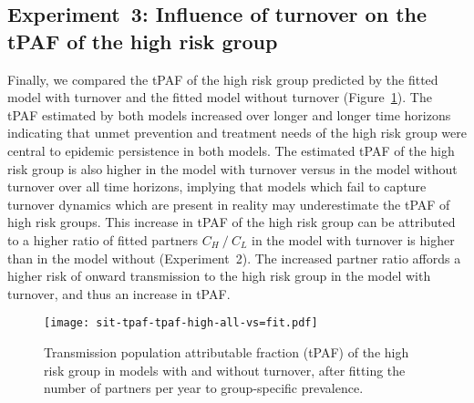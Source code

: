 \subsection{Experiment~3: Influence of turnover on the tPAF of the high risk group}
\label{ss:res-tpaf}
Finally, we compared the tPAF of the high risk group
predicted by the fitted model with turnover and 
the fitted model without turnover 
(Figure~\ref{fig:tpaf-fit}).
The tPAF estimated by both models
increased over longer and longer time horizons
indicating that unmet prevention and treatment
needs of the high risk group
were central to epidemic persistence in both models.			%
The estimated tPAF of the high risk group is also higher
in the model with turnover versus
in the model without turnover
over all time horizons,
implying that models which fail to capture turnover dynamics which are present in reality
may underestimate the tPAF of high risk groups.
This increase in tPAF of the high risk group can be attributed to
a higher ratio of fitted partners $C_H~/~C_L$
in the model with turnover is higher than in the model without
(Experiment~2).
The increased partner ratio affords
a higher risk of onward transmission to the high risk group
in the model with turnover, and thus an increase in tPAF.
\begin{figure}[!tbp]
  \centering
  \texttt{[image: sit-tpaf-tpaf-high-all-vs=fit.pdf]}
  \caption{Transmission population attributable fraction (tPAF)
    of the high risk group in models with and without turnover,
    after fitting the number of partners per year to group-specific prevalence.}
  \label{fig:tpaf-fit}
\end{figure}
